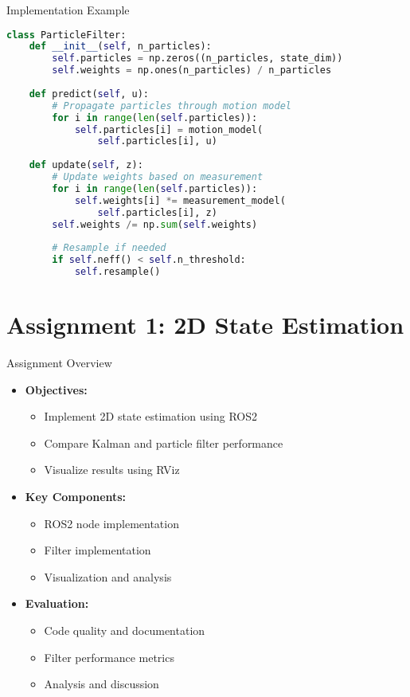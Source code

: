 \documentclass[aspectratio=169]{beamer}
\begin{document}
\begin{frame}{Implementation Example}
    \begin{lstlisting}[language=Python]
class ParticleFilter:
    def __init__(self, n_particles):
        self.particles = np.zeros((n_particles, state_dim))
        self.weights = np.ones(n_particles) / n_particles
        
    def predict(self, u):
        # Propagate particles through motion model
        for i in range(len(self.particles)):
            self.particles[i] = motion_model(
                self.particles[i], u)
            
    def update(self, z):
        # Update weights based on measurement
        for i in range(len(self.particles)):
            self.weights[i] *= measurement_model(
                self.particles[i], z)
        self.weights /= np.sum(self.weights)
        
        # Resample if needed
        if self.neff() < self.n_threshold:
            self.resample()
    \end{lstlisting}
\end{frame}

\section{Assignment 1: 2D State Estimation}

\begin{frame}{Assignment Overview}
    \begin{itemize}
        \item<1-> \textbf{Objectives:}
            \begin{itemize}
                \item Implement 2D state estimation using ROS2
                \item Compare Kalman and particle filter performance
                \item Visualize results using RViz
            \end{itemize}
        \item<2-> \textbf{Key Components:}
            \begin{itemize}
                \item ROS2 node implementation
                \item Filter implementation
                \item Visualization and analysis
            \end{itemize}
        \item<3-> \textbf{Evaluation:}
            \begin{itemize}
                \item Code quality and documentation
                \item Filter performance metrics
                \item Analysis and discussion
            \end{itemize}
    \end{itemize}
\end{frame}
\end{document}
